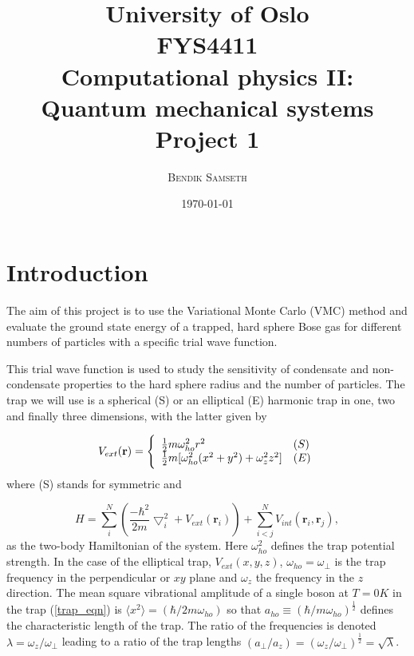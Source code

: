 \documentclass[]{article}
\title{ \small
University of Oslo\\
FYS4411\\
Computational physics II: Quantum mechanical systems\\
\huge Project 1 }
\author{\textsc{Bendik Samseth}}
\date{\today}
\begin{document}
\maketitle


\section{Introduction}
The aim of this project is to use the Variational Monte Carlo
(VMC) method and evaluate the ground state energy of a trapped, hard
sphere Bose gas for different numbers of particles with a specific
trial wave function.

This trial wave function is used to study the sensitivity of
condensate and non-condensate properties to the hard sphere radius
and the number of particles.  The trap we will use is a spherical (S)
or an elliptical (E) harmonic trap in one, two and finally three
dimensions, with the latter given by

\begin{equation}
    V_{ext}(\mathbf{r}) = 
    \Bigg\{
        \begin{array}{ll}
            \frac{1}{2}m\omega_{ho}^2r^2 & (S)\\
            \strut
            \frac{1}{2}m[\omega_{ho}^2(x^2+y^2) + \omega_z^2z^2] & (E)
            \label{trap_eqn}
        \end{array}
\end{equation}
 where (S) stands for symmetric and

\begin{equation}
    H = \sum_i^N \left(\frac{-\hbar^2}{2m}{\bigtriangledown }_{i}^2 +V_{ext}({\mathbf{r}}_i)\right)  +
     \sum_{i<j}^{N} V_{int}({\mathbf{r}}_i,{\mathbf{r}}_j),
\end{equation}
as the two-body Hamiltonian of the system.  Here $\omega_{ho}^2$
defines the trap potential strength.  In the case of the elliptical
trap, $V_{ext}(x,y,z)$, $\omega_{ho}=\omega_{\perp}$ is the trap
frequency in the perpendicular or $xy$ plane and $\omega_z$ the
frequency in the $z$ direction.  The mean square vibrational
amplitude of a single boson at $T=0K$ in the trap (\ref{trap_eqn}) is
$\langle x^2\rangle=(\hbar/2m\omega_{ho})$ so that $a_{ho} \equiv
(\hbar/m\omega_{ho})^{\frac{1}{2}}$ defines the characteristic length
of the trap.  The ratio of the frequencies is denoted
$\lambda=\omega_z/\omega_{\perp}$ leading to a ratio of the trap
lengths $(a_{\perp}/a_z)=(\omega_z/\omega_{\perp})^{\frac{1}{2}} =
\sqrt{\lambda}$.
\end{document}
